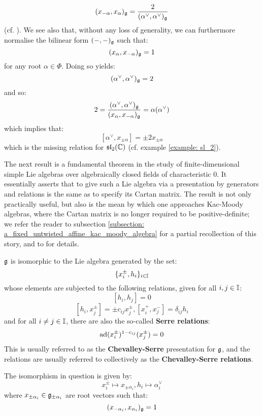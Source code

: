             $$(x_{-\alpha}, x_{\alpha})_{\mathfrak{g}} = \frac{2}{(\alpha^{\vee}, \alpha^{\vee})_{\mathfrak{g}}}$$
        (cf. \cite[Proposition 8.3]{humphreys_lie_algebras}). We see also that, without any loss of generality, we can furthermore normalise the bilinear form $(-, -)_{\mathfrak{g}}$ such that:
            $$(x_{\alpha}, x_{-\alpha})_{\mathfrak{g}} = 1$$
        for any root $\alpha \in \Phi$. Doing so yields:
            $$(\alpha^{\vee}, \alpha^{\vee})_{\mathfrak{g}} = 2$$
        and so:
            $$2 = \frac{(\alpha^{\vee}, \alpha^{\vee})_{\mathfrak{g}}}{(x_{\alpha}, x_{-\alpha})_{\mathfrak{g}}} = \alpha(\alpha^{\vee})$$
        which implies that:
            $$[\alpha^{\vee}, x_{\pm \alpha}] = \pm 2 x_{\pm \alpha}$$
        which is the missing relation for $\mathfrak{sl}_2(\mathbb{C})$ (cf. example \ref{example: sl_2}).
        
        The next result is a fundamental theorem in the study of finite-dimensional simple Lie algebras over algebraically closed fields of characteristic $0$. It essentially asserts that to give such a Lie algebra via a presentation by generators and relations is the same as to specify its Cartan matrix. The result is not only practically useful, but also is the mean by which one approaches Kac-Moody algebras, where the Cartan matrix is no longer required to be positive-definite; we refer the reader to subsection \ref{subsection: a_fixed_untwisted_affine_kac_moody_algebra} for a partial recollection of this story, and to \cite[Chapters 1-8]{kac_infinite_dimensional_lie_algebras} for details. 
        \begin{theorem} \label{theorem: serre_theorem_for_finite_dimensional_simple_lie_algebras}
            $\mathfrak{g}$ is isomorphic to the Lie algebra generated by the set:
                $$\{x_i^{\pm}, h_i\}_{i \in \mathbb{I}}$$
            whose elements are subjected to the following relations, given for all $i, j \in \mathbb{I}$:
                $$[h_i, h_j] = 0$$
                $$[h_i, x_j^{\pm}] = \pm c_{ij} x_j^{\pm}, [x_i^+, x_j^-] = \delta_{ij} h_i$$
            and for all $i \not = j \in \mathbb{I}$, there are also the so-called \textbf{Serre relations}:
                $$\mathrm{ad}(x_i^{\pm})^{1 - c_{ij}}(x_j^{\pm}) = 0$$
            This is usually referred to as the \textbf{Chevalley-Serre} presentation for $\mathfrak{g}$, and the relations are usually referred to collectively as the \textbf{Chevalley-Serre relations}.

            The isomorphism in question is given by:
                $$x_i^{\pm} \mapsto x_{\pm \alpha_i}, h_i \mapsto \alpha_i^{\vee}$$
            where $x_{\pm \alpha_i} \in \mathfrak{g}_{\pm \alpha_i}$ are root vectors such that:
                $$(x_{-\alpha_i}, x_{\alpha_i})_{\mathfrak{g}} = 1$$
        \end{theorem}

